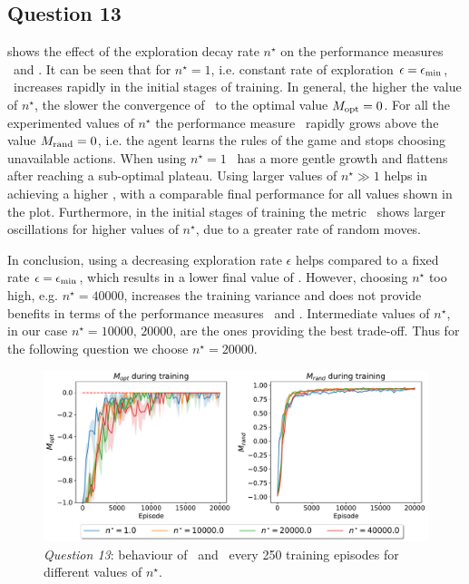 \documentclass[10pt]{IEEEtran}
\begin{document}
\subsection*{Question 13}
 shows the effect of the exploration decay rate $n^{\star}$ on the performance measures \mopt\  and \mrand.
It can be seen that for $n^{\star} = 1$, i.e. constant rate of exploration $\epsilon = \epsilon_{\text{min}}$, \mopt\ increases rapidly in the initial stages of training. In general, the higher the value of $n^{\star}$, the slower the convergence of \mopt\ to the optimal value $M_{\text{opt}} = 0$. 
For all the experimented values of $n^{\star}$ the performance measure \mrand\ rapidly grows above the value $M_{\text{rand}} = 0$, i.e. the agent learns the rules of the game and stops choosing unavailable actions. When using $n^{\star} = 1$ \mrand\ has a more gentle growth and flattens after reaching a sub-optimal plateau. Using larger values of $n^{\star} \gg 1$ helps in achieving a higher \mrand, with a comparable final performance for all values shown in the plot.
Furthermore, in the initial stages of training the metric \mopt\ shows larger oscillations for higher values of $n^{\star}$, due to a greater rate of random moves.

In conclusion, using a decreasing exploration rate $\epsilon$ helps compared to a fixed rate $\epsilon = \epsilon_{\text{min}}$, which results in a lower final value of \mrand. However, choosing $n^{\star}$ too high, e.g. $n^{\star} = 40000$, increases the training variance and does not provide benefits in terms of the performance measures \mopt\ and \mrand. Intermediate values of $n^{\star}$, in our case $n^{\star}=10000,\,20000$, are the ones providing the best trade-off. Thus for the following question we choose $n^{\star} = 20000$.

\begin{figure}[h]
    \centering
    \includegraphics[width = \linewidth]{code/figures/performance_dqn_n_star.pdf}
    \caption{\emph{Question 13}: behaviour of \mopt\  and \mrand\  every 250 training episodes for different values of $n^{\star}$.}
    \label{plot_question13}
\end{figure}
\end{document}
